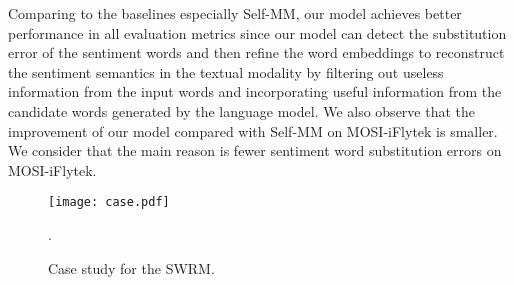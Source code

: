 \documentclass[11pt]{article}
\begin{document}
Comparing to the baselines especially Self-MM, our model achieves better performance in all evaluation metrics since our model can detect the substitution error of the sentiment words and then refine the word embeddings to reconstruct the sentiment semantics in the textual modality by filtering out useless information from the input words and incorporating useful information from the candidate words generated by the language model. We also observe that the improvement of our model compared with Self-MM on MOSI-iFlytek is smaller. We consider that the main reason is fewer sentiment word substitution errors on MOSI-iFlytek.



\begin{table}[tbp]
	\centering
	\caption{Ablation analysis of our proposed model evaluated on the MOSI-SpeechBrain dataset. The best results are in \textbf{bold}.}
	\label{tab:ablation_study}
\end{table}

\begin{figure}[t]
\centering
\texttt{[image: case.pdf]} %
\caption{Case study for the SWRM.}.
\label{case}
\end{figure}
\end{document}

